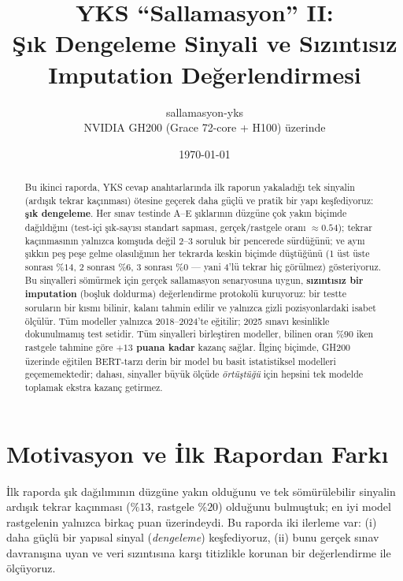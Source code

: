 \documentclass[11pt]{article}
\title{\textbf{YKS ``Sallamasyon'' II:\\
Şık Dengeleme Sinyali ve Sızıntısız Imputation Değerlendirmesi}}
\author{sallamasyon-yks \\ \small NVIDIA GH200 (Grace 72-core + H100) üzerinde}
\date{\today}
\begin{document}
\maketitle

\begin{abstract}
\noindent
Bu ikinci raporda, YKS cevap anahtarlarında ilk raporun yakaladığı tek
sinyalin (ardışık tekrar kaçınması) ötesine geçerek daha güçlü ve pratik
bir yapı keşfediyoruz: \textbf{şık dengeleme}. Her sınav testinde A--E
şıklarının düzgüne çok yakın biçimde dağıldığını (test-içi şık-sayısı
standart sapması, gerçek/rastgele oranı $\approx 0.54$); tekrar kaçınmasının
yalnızca komşuda değil 2--3 soruluk bir pencerede sürdüğünü; ve aynı şıkkın
peş peşe gelme olasılığının her tekrarda keskin biçimde düştüğünü
(1 üst üste sonrası $\%14$, 2 sonrası $\%6$, 3 sonrası $\%0$ --- yani 4'lü
tekrar hiç görülmez) gösteriyoruz. Bu sinyalleri sömürmek için gerçek
sallamasyon senaryosuna uygun, \textbf{sızıntısız bir imputation} (boşluk
doldurma) değerlendirme protokolü kuruyoruz: bir testte soruların bir kısmı
bilinir, kalanı tahmin edilir ve yalnızca gizli pozisyonlardaki isabet
ölçülür. Tüm modeller yalnızca 2018--2024'te eğitilir; 2025 sınavı kesinlikle
dokunulmamış test setidir. Tüm sinyalleri birleştiren modeller, bilinen oran
$\%90$ iken rastgele tahmine göre \textbf{$+13$ puana kadar} kazanç sağlar.
İlginç biçimde, GH200 üzerinde eğitilen BERT-tarzı derin bir model bu basit
istatistiksel modelleri geçememektedir; dahası, sinyaller büyük ölçüde
\emph{örtüştüğü} için hepsini tek modelde toplamak ekstra kazanç getirmez.
\end{abstract}

\section{Motivasyon ve İlk Rapordan Farkı}
İlk raporda şık dağılımının düzgüne yakın olduğunu ve tek sömürülebilir
sinyalin ardışık tekrar kaçınması ($\%13$, rastgele $\%20$) olduğunu
bulmuştuk; en iyi model rastgelenin yalnızca birkaç puan üzerindeydi. Bu
raporda iki ilerleme var: (i) daha güçlü bir yapısal sinyal (\emph{dengeleme})
keşfediyoruz, (ii) bunu gerçek sınav davranışına uyan ve veri sızıntısına
karşı titizlikle korunan bir değerlendirme ile ölçüyoruz.
\end{document}
